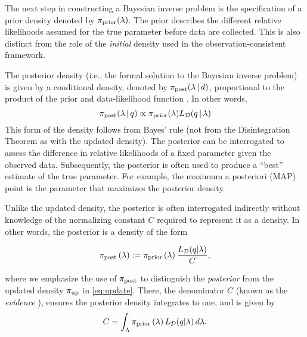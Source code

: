 The next step in constructing a Bayesian inverse problem is the specification of a prior density denoted by $\pi_\text{prior}(\lambda)$.
The prior describes the different relative likelihoods assumed for the true parameter before data are collected.
This is also distinct from the role of the {\em initial} density used in the observation-consistent framework.

The posterior density (i.e., the formal solution to the Bayesian inverse problem) is given by a conditional density, denoted by $\pi_\text{post}(\lambda\, | \, d)$, proportional to the product of the prior and data-likelihood function \citep{Walpole, Berger, Complete, Smith}.
In other words,
\begin{equation*}
	\operatorname*{\pi_{post}}(\lambda\, | \, q) \propto \operatorname*{\pi_{prior}}(\lambda)L_{\mathcal{D}}(q\, | \, \lambda)
\end{equation*}
This form of the density follows from Bayes' rule (not from the Disintegration Theorem as with the updated density).
The posterior can be interrogated to assess the difference in relative likelihoods of a fixed parameter given the observed data.
Subsequently, the posterior is often used to produce a ``best'' estimate of the true parameter.
For example, the maximum a posteriori (MAP) point is the parameter that maximizes the posterior density.

Unlike the updated density, the posterior is often interrogated indirectly without knowledge of the normalizing constant $C$ required to represent it as a density.
In other words, the posterior is a density of the form

\begin{equation}\label{eq:sb_post}
    \operatorname*{\pi_{post}}\left ( \lambda \right ) := \operatorname*{\pi_{prior}}\left ( \lambda \right ) \frac{L_{\mathcal{D}} (q | \lambda)}{ C },
\end{equation}

\noindent where we emphasize the use of $\operatorname*{\pi_{post}}$ to distinguish the \emph{posterior} from the updated density $\operatorname*{\pi_{up}}$ in \eqref{eq:update}.
There, the denominator $C$ (known as the \emph{evidence} \cite{Smith}), ensures the posterior density integrates to one, and is given by
\[
C = \int_{\Lambda} \operatorname*{\pi_{prior}}\left ( \lambda \right ) L_{\mathcal{D}}(q | \lambda) \, d\lambda.
\]

